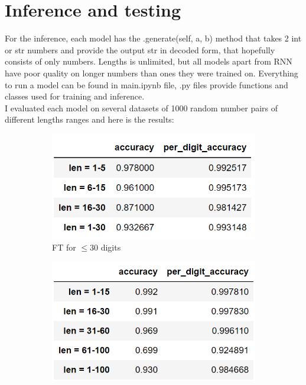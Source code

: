 \documentclass[a4paper,12pt]{article}
\begin{document}
	\section{Inference and testing}
		For the inference, each model has the .generate(self, a, b) method that takes 2 int or str numbers and provide the output str in decoded form, that hopefully consists of only numbers. Lengths is unlimited, but all models apart from RNN have poor quality on longer numbers than ones they were trained on. Everything to run a model can be found in main.ipynb file, .py files provide functions and classes used for training and inference.\\
		I evaluated each model on several datasets of 1000 random number pairs of different lengths ranges and here is the results: 
		
		\begin{figure}[h!]
			\begin{subfigure}[h]{0.5\linewidth}
				\centering
				\includegraphics[scale=0.5]{figures/t5-base_metrics_30.png}
				\caption{FT for $\leqslant 30$ digits}
			\end{subfigure}
			\hfill
			\begin{subfigure}[h]{0.5\linewidth}
				\centering
				\includegraphics[scale=0.5]{figures/t5-base_metrics_100.png}

\end{subfigure}
\end{figure}
\end{document}
